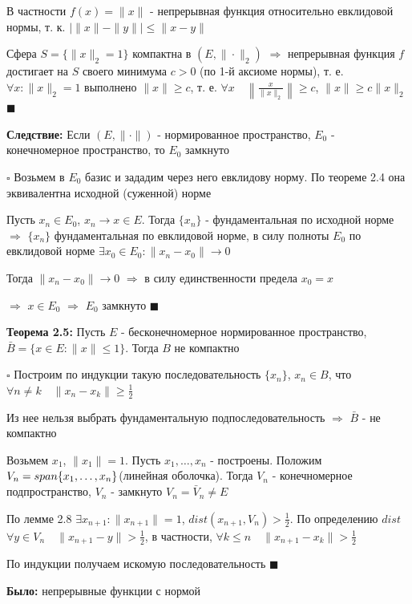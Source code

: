 \documentclass[a4paper]{report}
\newcommand*{\hm}[1]{#1\nobreak\discretionary{}%
            {\hbox{$\mathsurround=0pt #1$}}{}}
\begin{document}
В частности $f(x)=\|x\|$ - непрерывная функция относительно евклидовой нормы, т. к. $\left|\|x\|-\|y\|\right|\le\|x-y\|$

Сфера $S=\{\|x\|_2=1\}$ компактна в $(E,\|\cdot\|_2)$ $\Rightarrow$ непрерывная функция $f$ достигает на $S$ своего минимума
$c>0$ (по 1-й аксиоме нормы), т. е. $\forall x\colon\|x\|_2=1$ выполнено $\|x\|\ge c$, т. е. $\forall x\quad\left\|
\frac{x}{\|x\|_2}\right\|\ge c$, $\|x\|\ge c\|x\|_2$ $\blacksquare$
\bigskip

\noindent\textbf{Следствие:} Если $(E,\|\cdot\|)$ - нормированное пространство, $E_0$ - конечномерное пространство, то
$E_0$ замкнуто

\noindent $\square$ Возьмем в $E_0$ базис и зададим через него евклидову норму. По теореме 2.4 она эквивалентна исходной
(суженной) норме

Пусть $x_n\in E_0$, $x_n\to x\in E$. Тогда $\{x_n\}$ - фундаментальная по исходной норме $\Rightarrow$ $\{x_n\}$ фундаментальная
по евклидовой норме, в силу полноты $E_0$ по евклидовой норме $\exists x_0\in E_0\colon\|x_n-x_0\|\to0$

Тогда $\|x_n-x_0\|\to0$ $\Rightarrow$ в силу единственности предела $x_0=x$

$\Rightarrow$ $x\in E_0$ $\Rightarrow$ $E_0$ замкнуто $\blacksquare$
\bigskip

\noindent\textbf{Теорема 2.5:} Пусть $E$ - бесконечномерное нормированное пространство, $\bar B=\{x\in E\colon\|x\|\le1\}$.
Тогда $B$ не компактно

\noindent $\square$ Построим по индукции такую последовательность $\{x_n\}$, $x_n\in B$, что $\forall n\ne k\quad\|x_n-x_k\|
\ge\frac12$

Из нее нельзя выбрать фундаментальную подпоследовательность $\Rightarrow$ $\bar B$ - не компактно

Возьмем $x_1$, $\|x_1\|=1$. Пусть $x_1,\ldots,x_n$ - построены. Положим $V_n\hm=span\{x_1,\ldots,x_n\}$(линейная оболочка).
Тогда $V_n$ - конечномерное подпространство, $V_n$ - замкнуто $V_n=\bar V_n\ne E$

По лемме 2.8 $\exists x_{n+1}\colon\|x_{n+1}\|=1$, $dist(x_{n+1},V_n)>\frac12$. По определению $dist$ $\forall y\in V_n
\quad\|x_{n+1}-y\|>\frac12$, в частности, $\forall k\le n\quad\|x_{n+1}-x_k\|>\frac12$

По индукции получаем искомую последовательность $\blacksquare$
\bigskip
\bigskip

\noindent\textbf{Было:} непрерывные функции с нормой
\end{document}
